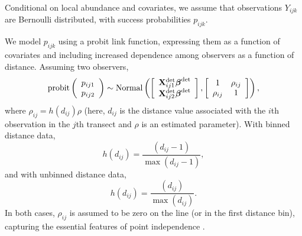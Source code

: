 \documentclass[10pt]{article}
\begin{document}
Conditional on local abundance and covariates, we assume that observations $Y_{ijk}$ are Bernoulli distributed, with success probabilities $p_{ijk}$.

We model $p_{ijk}$ using a probit link function, expressing them as a function of covariates and including increased dependence among observers as a function of distance.  Assuming two observers,
$$
{\rm probit} \left(\begin{array}{c}
				p_{ij1} \\
				p_{ij2}
		\end{array}\right) \sim {\rm Normal}
\left( \left[ \begin{array}{c}
				{\bf X}_{ij1}^{\rm det} \boldsymbol{\beta}^{\rm det}\\
				{\bf X}_{ij2}^{\rm det} \boldsymbol{\beta}^{\rm det}
		\end{array}\right],
        \left[ \begin{array}{cc}
            1 & \rho_{ij} \\
            \rho_{ij} & 1
        \end{array} \right]
\right),
$$
where $\rho_{ij} = h(d_{ij}) \rho$ (here, $d_{ij}$ is the distance value associated with the $i$th observation in the $j$th transect and $\rho$ is an estimated parameter).  With binned distance data,
$$
h(d_{ij})=\frac{(d_{ij}-1)}{\max(d_{ij}-1)},
$$
and with unbinned distance data,
$$
h(d_{ij})=\frac{(d_{ij})}{\max(d_{ij})}.
$$
In both cases, $\rho_{ij}$ is assumed to be zero on the line (or in the first distance bin), capturing the essential features of point independence \cite{BorchersEtAl2006,BucklandEtAl2010}.
\end{document}
